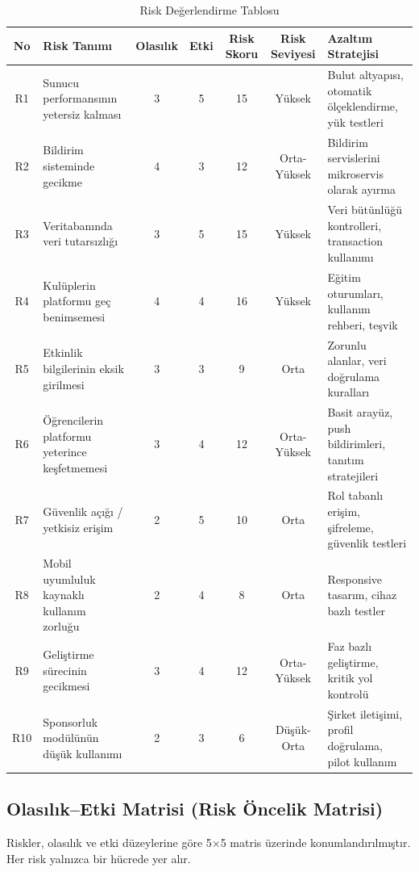 \documentclass[a4paper,12pt]{report}
\begin{document}
\begin{table}[H]
\centering
\caption{Risk Değerlendirme Tablosu}
\begin{tabular}{c p{5.2cm} c c c c p{4.5cm}}
\toprule
\textbf{No} & \textbf{Risk Tanımı} & \textbf{Olasılık} & \textbf{Etki} & \textbf{Risk Skoru} & \textbf{Risk Seviyesi} & \textbf{Azaltım Stratejisi} \\
\midrule
R1 & Sunucu performansının yetersiz kalması & 3 & 5 & 15 & Yüksek & Bulut altyapısı, otomatik ölçeklendirme, yük testleri \\
R2 & Bildirim sisteminde gecikme & 4 & 3 & 12 & Orta-Yüksek & Bildirim servislerini mikroservis olarak ayırma \\
R3 & Veritabanında veri tutarsızlığı & 3 & 5 & 15 & Yüksek & Veri bütünlüğü kontrolleri, transaction kullanımı \\
R4 & Kulüplerin platformu geç benimsemesi & 4 & 4 & 16 & Yüksek & Eğitim oturumları, kullanım rehberi, teşvik \\
R5 & Etkinlik bilgilerinin eksik girilmesi & 3 & 3 & 9 & Orta & Zorunlu alanlar, veri doğrulama kuralları \\
R6 & Öğrencilerin platformu yeterince keşfetmemesi & 3 & 4 & 12 & Orta-Yüksek & Basit arayüz, push bildirimleri, tanıtım stratejileri \\
R7 & Güvenlik açığı / yetkisiz erişim & 2 & 5 & 10 & Orta & Rol tabanlı erişim, şifreleme, güvenlik testleri \\
R8 & Mobil uyumluluk kaynaklı kullanım zorluğu & 2 & 4 & 8 & Orta & Responsive tasarım, cihaz bazlı testler \\
R9 & Geliştirme sürecinin gecikmesi & 3 & 4 & 12 & Orta-Yüksek & Faz bazlı geliştirme, kritik yol kontrolü \\
R10 & Sponsorluk modülünün düşük kullanımı & 2 & 3 & 6 & Düşük-Orta & Şirket iletişimi, profil doğrulama, pilot kullanım \\
\bottomrule
\end{tabular}
\end{table}

\subsection{Olasılık–Etki Matrisi (Risk Öncelik Matrisi)}

Riskler, olasılık ve etki düzeylerine göre 5×5 matris üzerinde konumlandırılmıştır. Her risk yalnızca bir hücrede yer alır.
\end{document}
